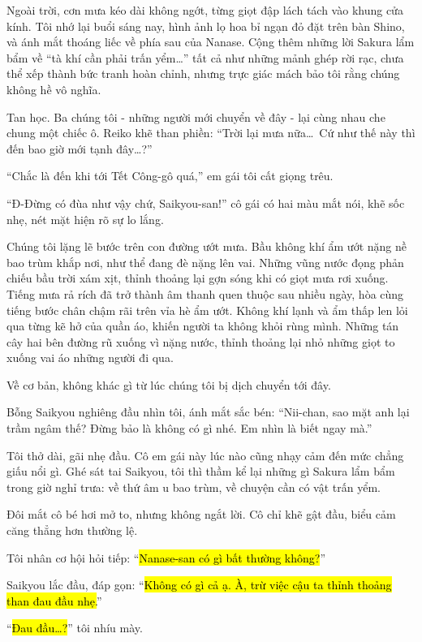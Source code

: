 \documentclass[../main.tex]{subfiles}
\begin{document}
Ngoài trời, cơn mưa kéo dài không ngớt, từng giọt đập lách tách vào khung cửa kính. Tôi nhớ lại buổi sáng nay, hình ảnh lọ hoa bỉ ngạn đỏ đặt trên bàn Shino, và ánh mắt thoáng liếc về phía sau của Nanase. Cộng thêm những lời Sakura lẩm bẩm về ``tà khí cần phải trấn yểm\dots'' tất cả như những mảnh ghép rời rạc, chưa thể xếp thành bức tranh hoàn chỉnh, nhưng trực giác mách bảo tôi rằng chúng không hề vô nghĩa.

Tan học. Ba chúng tôi - những người mới chuyển về đây - lại cùng nhau che chung một chiếc ô. Reiko khẽ than phiền: ``Trời lại mưa nữa\dots\ Cứ như thế này thì đến bao giờ mới tạnh đây\dots?''

``Chắc là đến khi tới Tết Công-gô quá,'' em gái tôi cất giọng trêu.

``Đ-Đừng có đùa như vậy chứ, Saikyou-san!'' cô gái có hai màu mắt nói, khẽ sốc nhẹ, nét mặt hiện rõ sự lo lắng.

Chúng tôi lặng lẽ bước trên con đường ướt mưa. Bầu không khí ẩm ướt nặng nề bao trùm khắp nơi, như thể đang đè nặng lên vai. Những vũng nước đọng phản chiếu bầu trời xám xịt, thỉnh thoảng lại gợn sóng khi có giọt mưa rơi xuống. Tiếng mưa rả rích đã trở thành âm thanh quen thuộc sau nhiều ngày, hòa cùng tiếng bước chân chậm rãi trên vỉa hè ẩm ướt. Không khí lạnh và ẩm thấp len lỏi qua từng kẽ hở của quần áo, khiến người ta không khỏi rùng mình. Những tán cây hai bên đường rũ xuống vì nặng nước, thỉnh thoảng lại nhỏ những giọt to xuống vai áo những người đi qua.

Về cơ bản, không khác gì từ lúc chúng tôi bị dịch chuyển tới đây.

Bỗng Saikyou nghiêng đầu nhìn tôi, ánh mắt sắc bén: ``Nii-chan, sao mặt anh lại trầm ngâm thế? Đừng bảo là không có gì nhé. Em nhìn là biết ngay mà.''

Tôi thở dài, gãi nhẹ đầu. Cô em gái này lúc nào cũng nhạy cảm đến mức chẳng giấu nổi gì. Ghé sát tai Saikyou, tôi thì thầm kể lại những gì Sakura lẩm bẩm trong giờ nghỉ trưa: về thứ âm u bao trùm, về chuyện cần có vật trấn yểm.

Đôi mắt cô bé hơi mở to, nhưng không ngắt lời. Cô chỉ khẽ gật đầu, biểu cảm căng thẳng hơn thường lệ.

Tôi nhân cơ hội hỏi tiếp: ``\hl{Nanase-san có gì bất thường không?}''

Saikyou lắc đầu, đáp gọn: ``\hl{Không có gì cả ạ. À, trừ việc cậu ta thỉnh thoảng than đau đầu nhẹ.}''

``\hl{Đau đầu\dots?}'' tôi nhíu mày.
\end{document}
